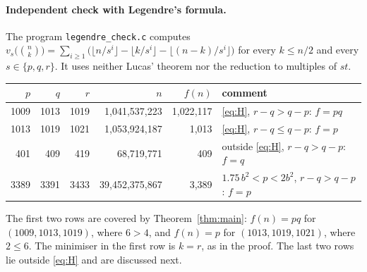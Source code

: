 \documentclass[11pt,a4paper]{article}
\theoremstyle{definition}
\newcommand{\bin}[2]{\binom{#1}{#2}}
\begin{document}
\paragraph{Independent check with Legendre's formula.}
The program \texttt{legendre\_check.c} computes $v_s\bigl(\bin nk\bigr)=\sum_{i\ge1}\bigl(\lfloor n/s^i\rfloor-\lfloor k/s^i\rfloor-\lfloor(n-k)/s^i\rfloor\bigr)$ for every $k\le n/2$ and every $s\in\{p,q,r\}$. It uses neither Lucas' theorem nor the reduction to multiples of $st$.
\begin{center}
\begin{tabular}{rrrrrl}\toprule
$p$ & $q$ & $r$ & $n$ & $f(n)$ & comment\\\midrule
1009 & 1013 & 1019 & 1{,}041{,}537{,}223 & 1{,}022{,}117 & \eqref{eq:H}, $r-q>q-p$: $f=pq$\\
1013 & 1019 & 1021 & 1{,}053{,}924{,}187 & 1{,}013 & \eqref{eq:H}, $r-q\le q-p$: $f=p$\\
401 & 409 & 419 & 68{,}719{,}771 & 409 & outside \eqref{eq:H}, $r-q>q-p$: $f=q$\\
3389 & 3391 & 3433 & 39{,}452{,}375{,}867 & 3{,}389 & $1.75\,b^2<p<2b^2$, $r-q>q-p$: $f=p$\\
\bottomrule
\end{tabular}
\end{center}
The first two rows are covered by Theorem~\ref{thm:main}: $f(n)=pq$ for $(1009,1013,1019)$, where $6>4$, and $f(n)=p$ for $(1013,1019,1021)$, where $2\le6$. The minimiser in the first row is $k=r$, as in the proof. The last two rows lie outside \eqref{eq:H} and are discussed next.
\end{document}
